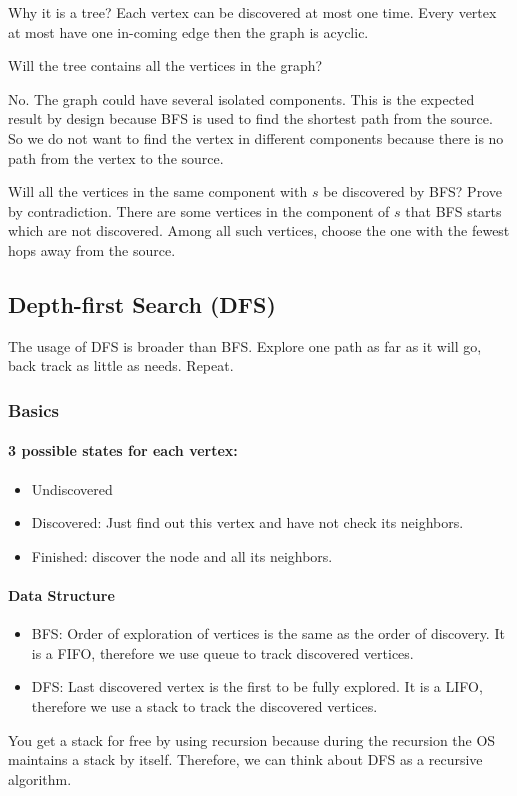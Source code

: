 \documentclass[en,hazy,blue,screen,14pt]{elegantnote}
\begin{document}
Why it is a tree? Each vertex can be discovered at most one time. Every 
vertex at most have one in-coming edge then the graph is acyclic.

Will the tree contains all the vertices in the graph? 

No. The graph could have 
several isolated components. This is the expected result by design because BFS 
is used to find the shortest path from the source. So we do not want to find 
the vertex in different components because there is no path from the vertex to 
the source.

Will all the vertices in the same component with $s$ be discovered by BFS?
Prove by contradiction. There are some vertices in the component of $s$ that 
BFS starts which are not discovered. Among all such vertices, choose the one 
with the fewest hops away from the source.
\subsection{Depth-first Search (DFS)}
The usage of DFS is broader than BFS. Explore one path as far as it will go, 
back track as little as needs. Repeat.

\subsubsection{Basics}

\paragraph{3 possible states for each vertex:}
\begin{itemize}
 \item Undiscovered
 \item Discovered: Just find out this vertex and have not check its neighbors.
 \item Finished: discover the node and all its neighbors.
\end{itemize}
\paragraph{Data Structure}
\begin{itemize}
\item BFS: Order of exploration of vertices is the same as the order of 
discovery. It is a FIFO, therefore we use queue to track discovered vertices.
\item DFS: Last discovered vertex is the first to be fully explored. It is a 
LIFO, therefore we use a stack to track the discovered vertices.
\end{itemize}
You get a stack for free by using recursion because during the recursion the 
OS maintains a stack by itself. Therefore, we can think about DFS as a 
recursive algorithm.
\end{document}
